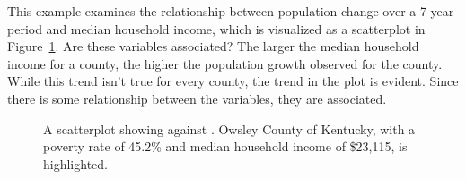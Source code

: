 \begin{examplewrap}
\begin{nexample}{This example examines the relationship
    between population change over a 7-year period and
    median household income,
    which is visualized as a scatterplot in
    Figure~\ref{pop_change_v_med_income}.
    Are these variables associated?}
  The larger the median household income for a county,
  the higher the population growth observed for the county.
  While this trend isn't true for every county,
  the trend in the plot is evident.
  Since there is some relationship between the variables,
  they are associated.
\end{nexample}
\end{examplewrap}




\begin{figure}
  \centering
  \caption{A scatterplot showing
      against .
      Owsley County of Kentucky, with a poverty rate of 45.2\%
      and median household income of \$23,115, is highlighted.}
  \label{pop_change_v_med_income}
\end{figure}

